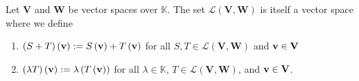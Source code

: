 \begin{theorem}\label{thm:linear-maps-are-a-vector-space}
    Let \( \mathbf{V} \) and \( \mathbf{W} \) be vector spaces over \( \mathbb{K} \). The set \( \mathcal{L} \left( \mathbf{V}, \mathbf{W} \right) \) is itself a vector space where we define 
    \begin{enumerate}[label=\textbf{\roman*)}]
        \item \( \left( S +T \right) \left( \vb{v} \right): = S \left( \vb{v} \right) + T \left( \vb{v} \right) \) for all \( S,T \in   \mathcal{L} \left( \mathbf{V}, \mathbf{W} \right)\) and \( \vb{v} \in \mathbf{V} \)
        \item \( \left( \lambda T  \right)(\vb{v}) := \lambda \left( T \left( \vb{v} \right) \right) \) for all \( \lambda \in \mathbb{K} \), \( T \in   \mathcal{L} \left( \mathbf{V}, \mathbf{W} \right) \), and \( \vb{v} \in \mathbf{V} \).
    \end{enumerate}
\end{theorem}
